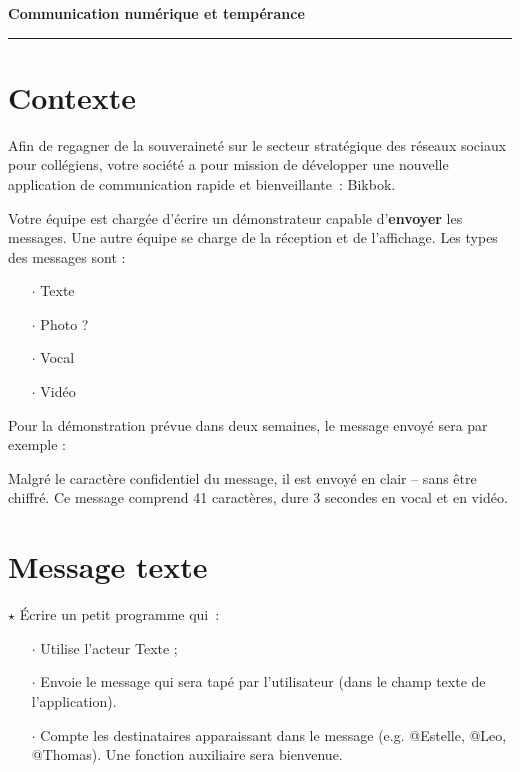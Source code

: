 \documentclass[a4paper]{article}
\begin{document}
\begin{center}
  \Large\bf Communication numérique et tempérance  %
\end{center}

\noindent\rule{\linewidth}{.6pt}

\section*{Contexte}

Afin de regagner de la souveraineté sur le secteur stratégique des réseaux sociaux pour collégiens, votre société a pour mission de développer une nouvelle application de communication rapide et bienveillante~: Bikbok.

Votre équipe est chargée d'écrire un démonstrateur capable d'\textbf{envoyer} les messages. Une autre équipe se charge de la réception et de l'affichage. Les types des messages sont :

\begin{itemize}[itemsep=0.2ex]
\item[$\cdot$] Texte
\item[$\cdot$] Photo ?
\item[$\cdot$] Vocal
\item[$\cdot$] Vidéo
\end{itemize}

Pour la démonstration prévue dans deux semaines, le message envoyé sera par exemple :

\smallskip
\centerline{}
\smallskip

Malgré le caractère confidentiel du message, il  est envoyé en clair -- sans être chiffré. Ce message comprend 41 caractères, dure 3 secondes en vocal et en vidéo.

\section{Message texte}

$\star$ Écrire un petit programme qui~:

\begin{itemize}[itemsep=0.2ex]
\item[$\cdot$] Utilise l'acteur Texte ;
\item[$\cdot$] Envoie le message qui sera tapé par l'utilisateur (dans le champ texte de l'application).
\item[$\cdot$] Compte les destinataires apparaissant dans le message (e.g. @Estelle, @Leo, @Thomas). Une fonction auxiliaire sera bienvenue.
\end{itemize}
\end{document}
